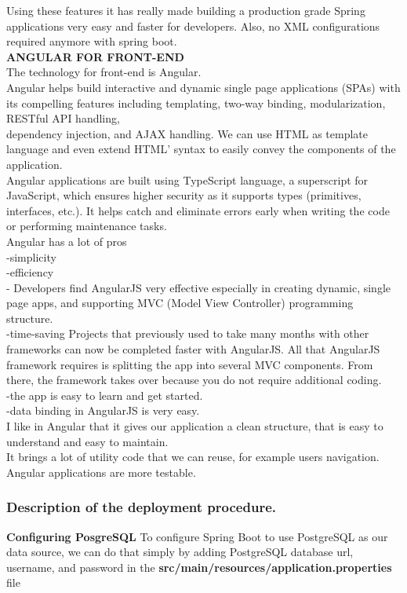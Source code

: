 \documentclass{scrartcl}
\begin{document}
Using these features it has really made building a production grade Spring applications very easy and faster for developers. Also, no XML configurations required anymore with spring boot.\\

\textbf{ANGULAR FOR FRONT-END} \\
The technology for front-end is Angular.\\
Angular helps build interactive and dynamic single page applications (SPAs) with its compelling features including templating, two-way binding, modularization, RESTful API handling,\\ dependency injection, and AJAX handling. We can use HTML as template language and even extend HTML’ syntax to easily convey the components of the application.\\
Angular applications are built using TypeScript language, a superscript for JavaScript, which ensures higher security as it supports types (primitives, interfaces, etc.). It helps catch and eliminate errors early when writing the code or performing maintenance tasks.\\
Angular has a lot of pros\\
-simplicity\\
-efficiency\\
- Developers find AngularJS very effective especially in creating dynamic, single page apps, and supporting MVC (Model View Controller) programming structure.\\
-time-saving Projects that previously used to take many months with other frameworks can now be completed faster with AngularJS. All that AngularJS framework requires is splitting the app into several MVC components. From there, the framework takes over because you do not require additional coding.\\
-the app is easy to learn and get started.\\
-data binding in AngularJS is very easy.\\
I like in Angular that it gives our application a clean structure, that is easy to understand and easy to maintain.\\
It brings a lot of utility code that we can reuse, for example users navigation. Angular applications are more testable.\\

\subsubsection{Description of the deployment procedure.}
\textbf{Configuring PosgreSQL}
 To configure Spring Boot to use PostgreSQL as our data source, we can do that simply by adding PostgreSQL database url, username, and password in the \textbf{src/main/resources/application.properties} file \\
 
\end{document}
